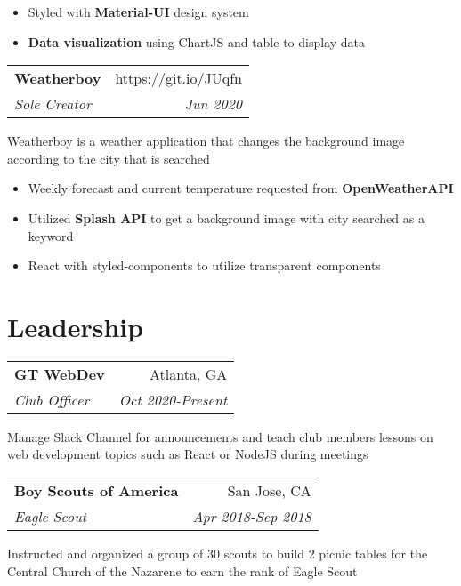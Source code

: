 \documentclass[letterpaper,8pt]{article}
\makeatletter
\newcommand{\resumeSubheading}[4]{
  \vspace{0.25em}
  \begin{tabular*}{1\textwidth}[t]{l@{\extracolsep{\fill}}r}
    \textbf{#1} & #2 \\
    \textit{#3} & \textit{#4} \\
  \end{tabular*}\vspace{-5pt}
}
\makeatother
\begin{document}
\begin{itemize}[label=\raisebox{0.25ex}{\tiny$\bullet$}]
  \item Styled with \textbf{Material-UI} design system
  \item \textbf{Data visualization} using ChartJS and table to display data
\end{itemize}
\vspace{5pt}

\resumeSubheading{Weatherboy}{https://git.io/JUqfn}{Sole Creator}{Jun 2020}

Weatherboy is a weather application that changes the background image according to the city that is searched

\begin{itemize}[label=\raisebox{0.25ex}{\tiny$\bullet$}]
  \item Weekly forecast and current temperature requested from \textbf{OpenWeatherAPI}
  \item Utilized \textbf{Splash API} to get a background image with city searched as a keyword
  \item React with styled-components to utilize transparent components
\end{itemize}
\vspace{5pt}

\section{Leadership}

\resumeSubheading{GT WebDev}
{Atlanta, GA}{Club Officer}{Oct 2020-Present}

Manage Slack Channel for announcements and teach club members lessons on web development topics such as React or NodeJS during meetings

\vspace{5pt}
\resumeSubheading{Boy Scouts of America}
{San Jose, CA}{Eagle Scout}{Apr 2018-Sep 2018}

Instructed and organized a group of 30 scouts to build 2 picnic tables for the Central Church of the Nazarene to earn the rank of Eagle Scout
\end{document}
